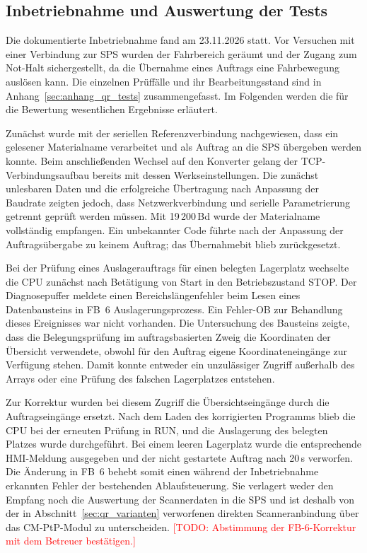 \subsection{Inbetriebnahme und Auswertung der Tests}
\label{sec:qr_test}

Die dokumentierte Inbetriebnahme fand am 23.11.2026 statt. Vor Versuchen mit einer Verbindung zur SPS wurden der Fahrbereich geräumt und der Zugang zum Not-Halt sichergestellt, da die Übernahme eines Auftrags eine Fahrbewegung auslösen kann. Die einzelnen Prüffälle und ihr Bearbeitungsstand sind in Anhang~\ref{sec:anhang_qr_tests} zusammengefasst. Im Folgenden werden die für die Bewertung wesentlichen Ergebnisse erläutert.

Zunächst wurde mit der seriellen Referenzverbindung nachgewiesen, dass ein gelesener Materialname verarbeitet und als Auftrag an die SPS übergeben werden konnte. Beim anschließenden Wechsel auf den Konverter gelang der TCP-Verbindungsaufbau bereits mit dessen Werkseinstellungen. Die zunächst unlesbaren Daten und die erfolgreiche Übertragung nach Anpassung der Baudrate zeigten jedoch, dass Netzwerkverbindung und serielle Parametrierung getrennt geprüft werden müssen. Mit 19\,200\,Bd wurde der Materialname vollständig empfangen. Ein unbekannter Code führte nach der Anpassung der Auftragsübergabe zu keinem Auftrag; das Übernahmebit blieb zurückgesetzt.

Bei der Prüfung eines Auslagerauftrags für einen belegten Lagerplatz wechselte die CPU zunächst nach Betätigung von \glqq Start\grqq{} in den Betriebszustand STOP. Der Diagnosepuffer meldete einen Bereichslängenfehler beim Lesen eines Datenbausteins in FB~6 \glqq Auslagerungsprozess\grqq{}. Ein Fehler-OB zur Behandlung dieses Ereignisses war nicht vorhanden. Die Untersuchung des Bausteins zeigte, dass die Belegungsprüfung im auftragsbasierten Zweig die Koordinaten der Übersicht verwendete, obwohl für den Auftrag eigene Koordinateneingänge zur Verfügung stehen. Damit konnte entweder ein unzulässiger Zugriff außerhalb des Arrays oder eine Prüfung des falschen Lagerplatzes entstehen.

Zur Korrektur wurden bei diesem Zugriff die Übersichtseingänge durch die Auftragseingänge ersetzt. Nach dem Laden des korrigierten Programms blieb die CPU bei der erneuten Prüfung in RUN, und die Auslagerung des belegten Platzes wurde durchgeführt. Bei einem leeren Lagerplatz wurde die entsprechende HMI-Meldung ausgegeben und der nicht gestartete Auftrag nach 20\,s verworfen. Die Änderung in FB~6 behebt somit einen während der Inbetriebnahme erkannten Fehler der bestehenden Ablaufsteuerung. Sie verlagert weder den Empfang noch die Auswertung der Scannerdaten in die SPS und ist deshalb von der in Abschnitt~\ref{sec:qr_varianten} verworfenen direkten Scanneranbindung über das CM-PtP-Modul zu unterscheiden. \textcolor{red}{[TODO: Abstimmung der FB-6-Korrektur mit dem Betreuer bestätigen.]}

